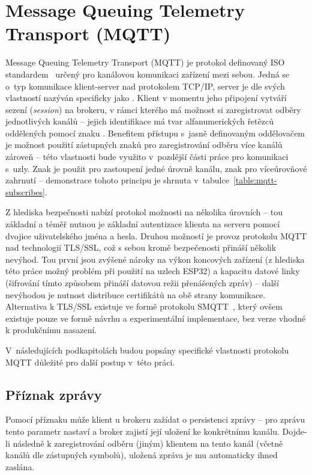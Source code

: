 \section{Message Queuing Telemetry Transport (MQTT)}\label{sec:mqtt}
Message Queuing Telemetry Transport (MQTT) je protokol definovaný ISO standardem~\cite{ISOMQTT} určený pro
kanálovou komunikaci zařízení mezi sebou.
Jedná se o~typ komunikace klient-server nad protokolem TCP/IP, server je dle svých vlastností nazýván
specificky jako .
Klient v momentu jeho připojení vytváří sezení (\textit{session}) na brokeru, v rámci kterého má možnost si zaregistrovat
odběry jednotlivých kanálů -- jejich identifikace má tvar alfanumerických řetězců oddělených pomocí znaku \ic{/}.
Benefitem přístupu s~jasně definovaným oddělovačem je možnost použití zástupných znaků pro
zaregistrování odběru více kanálů zároveň -- této vlastnosti bude využito v~pozdější části práce pro komunikaci s~uzly.
Znak \ic{+} je použit pro zastoupení jedné úrovně kanálu, znak \ic{#} pro víceúrovňové zahrnutí -- demonstrace tohoto
principu je shrnuta v~tabulce~\ref{table:mqtt-subscribes}.

Z hlediska bezpečnosti nabízí protokol možnosti na několika úrovních -- tou základní a téměř nutnou je základní
autentizace klienta na serveru pomocí dvojice uživatelského jména a hesla.
Druhou možností je provoz protokolu MQTT nad technologií TLS/SSL, což s sebou kromě bezpečenosti přináší několik nevýhod.
Tou první jsou zvýšené nároky na výkon koncových zařízení (z hlediska této práce možný problém při použití na
uzlech ESP32) a kapacitu datové linky (šifrování tímto způsobem přináší datovou režii přenášených zpráv) -- další
nevýhodou je nutnost distribuce certifikátů na obě strany komunikace.
Alternativa k TLS/SSL existuje ve formě protokolu SMQTT~\cite{SMQTT}, který
ovšem existuje pouze ve formě návrhu a experimentální implementace, bez verze vhodné k produkčnímu nasazení.

V~následujících podkapitolách budou popsány specifické vlastnosti protokolu MQTT důležité pro další postup v~této
práci.

\subsection{Příznak zprávy }\label{subsec:priznak-zpravy-retain}
Pomocí příznaku  může klient u brokeru zažídat o persistenci zprávy -- pro zprávu tento parametr nastaví a
broker zajistí její uložení ke konkrétnímu kanálu.
Dojde-li následně k zaregistrování odběru (jiným) klientem na tento kanál (včetně kanálů dle zástupných symbolů),
uložená zpráva je mu automaticky ihned zaslána.

